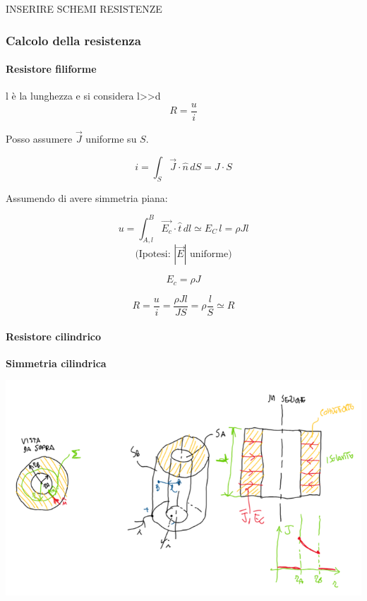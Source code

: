         INSERIRE SCHEMI RESISTENZE

        \subsubsection{Calcolo della resistenza}
        \paragraph{Resistore filiforme}
            l è la lunghezza e si considera l>>d
            \[
            R = \frac{u}{i}
            \]
            
            \noindent
            Posso assumere $\vec{J}$ uniforme su $S$.
            
            \[
            i = \int_S \vec{J} \cdot \hat{n}\, dS = J \cdot S
            \]
            
            \noindent
            Assumendo di avere simmetria piana:
            
            \[
            u = \int_{A,l}^B \vec{E_c} \cdot \hat{t}\, dl \simeq E_C \, l = \rho J l
            \]
            \[
            \text{(Ipotesi: } |\vec{E}| \text{ uniforme)}
            \]
            
            \[
            E_c = \rho J
            \]
            
            \[
            R = \frac{u}{i} = \frac{\rho J l}{J S} = \rho \frac{l}{S} \simeq R
            \]
        \paragraph{Resistore cilindrico}
        \textbf{Simmetria cilindrica}
        \begin{center}
            \includegraphics[scale = 0.5]{immagini/image15.png}
        \end{center}
        

